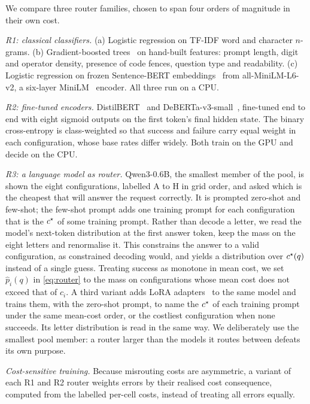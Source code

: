 We compare three router families, chosen to span four orders of magnitude
in their own cost.

\emph{R1: classical classifiers.} (a) Logistic regression on TF-IDF word and
character $n$-grams. (b) Gradient-boosted trees~\cite{chen2016xgboost,ke2017lightgbm} on hand-built features: prompt length,
digit and operator density, presence of code fences, question type and
readability. (c) Logistic regression on frozen Sentence-BERT
embeddings~\cite{reimers2019sbert} from all-MiniLM-L6-v2, a six-layer
MiniLM~\cite{wang2020minilm} encoder. All three run on a CPU.

\emph{R2: fine-tuned encoders.} DistilBERT~\cite{sanh2019distilbert} and
DeBERTa-v3-small~\cite{he2021deberta,he2023debertav3}, fine-tuned end to end
with eight sigmoid outputs on the first token's final hidden state. The
binary cross-entropy is class-weighted so that success and failure carry
equal weight in each configuration, whose base rates differ widely. Both
train on the GPU and decide on the CPU.

\emph{R3: a language model as router.} Qwen3-0.6B, the smallest member of
the pool, is shown the eight configurations, labelled A to H in grid
order, and asked which is the cheapest that will answer the request
correctly. It is prompted zero-shot and few-shot; the few-shot prompt adds
one training prompt for each configuration that is the $c^{\star}$ of some
training prompt. Rather than decode a letter, we read the model's
next-token distribution at the first answer token, keep the mass on the
eight letters and renormalise it. This constrains the answer to a valid
configuration, as constrained decoding would, and yields a distribution
over $c^{\star}(q)$ instead of a single guess. Treating success as monotone
in mean cost, we set $\hat{p}_i(q)$ in \eqref{eq:router} to the mass on
configurations whose mean cost does not exceed that of $c_i$. A third
variant adds LoRA adapters~\cite{hu2022lora} to the same model and trains
them, with the zero-shot prompt, to name the $c^{\star}$ of each training
prompt under the same mean-cost order, or the costliest configuration when
none succeeds. Its letter distribution is read in the same way. We
deliberately use the smallest pool member: a router larger than the models
it routes between defeats its own purpose.

\emph{Cost-sensitive training.} Because misrouting costs are asymmetric, a
variant of each R1 and R2 router weights errors by their realised cost
consequence, computed from the labelled per-cell costs, instead of treating
all errors equally.

